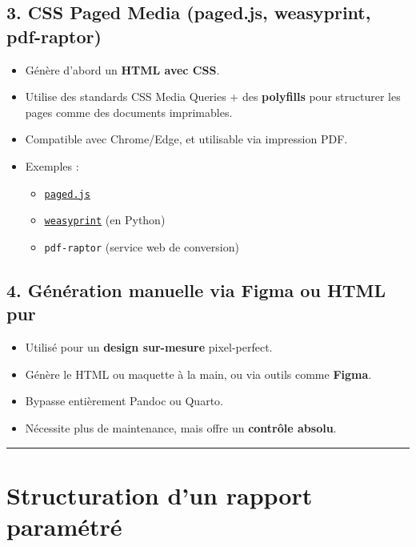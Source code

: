 \documentclass[
  letterpaper,
  DIV=11,
  numbers=noendperiod]{scrartcl}
\providecommand{\tightlist}{%
  \setlength{\itemsep}{0pt}\setlength{\parskip}{0pt}}\usepackage{longtable,booktabs,array}
\begin{document}
\subsection{3. CSS Paged Media (paged.js, weasyprint,
pdf-raptor)}\label{css-paged-media-paged.js-weasyprint-pdf-raptor}

\begin{itemize}
\tightlist
\item
  Génère d'abord un \textbf{HTML avec CSS}.
\item
  Utilise des standards CSS Media Queries + des \textbf{polyfills} pour
  structurer les pages comme des documents imprimables.
\item
  Compatible avec Chrome/Edge, et utilisable via impression PDF.
\item
  Exemples :

  \begin{itemize}
  \tightlist
  \item
    \href{https://pagedjs.org}{\texttt{paged.js}}
  \item
    \href{https://weasyprint.org}{\texttt{weasyprint}} (en Python)
  \item
    \texttt{pdf-raptor} (service web de conversion)
  \end{itemize}
\end{itemize}

\subsection{4. Génération manuelle via Figma ou HTML
pur}\label{guxe9nuxe9ration-manuelle-via-figma-ou-html-pur}

\begin{itemize}
\tightlist
\item
  Utilisé pour un \textbf{design sur-mesure} pixel-perfect.
\item
  Génère le HTML ou maquette à la main, ou via outils comme
  \textbf{Figma}.
\item
  Bypasse entièrement Pandoc ou Quarto.
\item
  Nécessite plus de maintenance, mais offre un \textbf{contrôle absolu}.
\end{itemize}

\begin{center}\rule{0.5\linewidth}{0.5pt}\end{center}

\section{Structuration d'un rapport
paramétré}\label{structuration-dun-rapport-paramuxe9truxe9}
\end{document}
